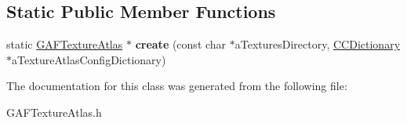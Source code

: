 \subsection*{Static Public Member Functions}
\begin{DoxyCompactItemize}
\item 
\hypertarget{class_g_a_f_1_1_g_a_f_texture_atlas_a52a21a062a5b52719eda910c3f335070}{static \hyperlink{class_g_a_f_1_1_g_a_f_texture_atlas}{G\-A\-F\-Texture\-Atlas} $\ast$ {\bfseries create} (const char $\ast$a\-Textures\-Directory, \hyperlink{class_g_a_f_1_1_c_c_dictionary}{C\-C\-Dictionary} $\ast$a\-Texture\-Atlas\-Config\-Dictionary)}\label{class_g_a_f_1_1_g_a_f_texture_atlas_a52a21a062a5b52719eda910c3f335070}

\end{DoxyCompactItemize}


The documentation for this class was generated from the following file\-:\begin{DoxyCompactItemize}
\item 
G\-A\-F\-Texture\-Atlas.\-h\end{DoxyCompactItemize}
